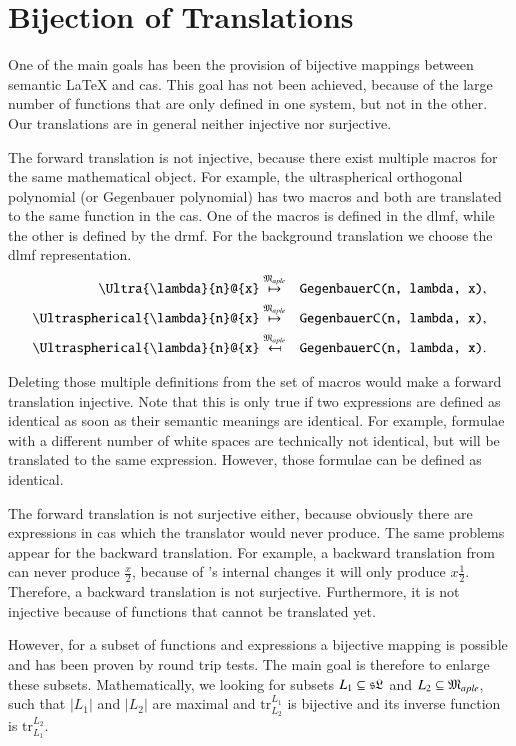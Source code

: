 \section{Bijection of Translations}
One of the main goals has been the provision of bijective mappings between semantic \LaTeX{} and \gls{cas}. This goal has not been achieved, because of the large number of functions that are only defined in one system, but not in the other. Our translations are in general neither injective nor surjective.

The forward translation is not injective, because there exist multiple macros for the same mathematical object. For example, the ultraspherical orthogonal polynomial (or Gegenbauer polynomial) has two macros and both are translated to the same function in the \gls{cas}. One of the macros is defined in the \gls{dlmf}, while the other is defined by the \gls{drmf}. For the background translation we choose the \gls{dlmf} representation.
\begin{eqnarray*}
	\verb|\Ultra{\lambda}{n}@{x}| & \overset{\langMaple}{\mapsto} & \verb|GegenbauerC(n, lambda, x)|,\\
	\verb|\Ultraspherical{\lambda}{n}@{x}| & \overset{\langMaple}{\mapsto} & \verb|GegenbauerC(n, lambda, x)|,\\
	\verb|\Ultraspherical{\lambda}{n}@{x}| & \overset{\langMaple}{\mapsfrom} & \verb|GegenbauerC(n, lambda, x)|.
\end{eqnarray*}

Deleting those multiple definitions from the set of macros would make a forward translation injective. Note that this is only true if two expressions are defined as identical as soon as their semantic meanings are identical. For example, formulae with a different number of white spaces are technically not identical, but will be translated to the same expression. However, those formulae can be defined as identical.

The forward translation is not surjective either, because obviously there are expressions in \gls{cas} which the translator would never produce. The same problems appear for the backward translation. For example, a backward translation from \Maple{} can never produce $\frac{x}{2}$, because of \Maple's internal changes it will only produce $x\frac{1}{2}$. Therefore, a backward translation is not surjective. Furthermore, it is not injective because of functions that cannot be translated yet.

However, for a subset of functions and expressions a bijective mapping is possible and has been proven by round trip tests. The main goal is therefore to enlarge these subsets. Mathematically, we looking for subsets $L_1 \subseteq \mathfrak{sL}$ and $L_2 \subseteq \mathfrak{M}_{aple}$, such that $|L_1|$ and $|L_2|$ are maximal and $\mathrm{tr}^{L_1}_{L_2}$ is bijective and its inverse function is $\mathrm{tr}^{L_2}_{L_1}$.

